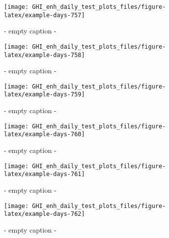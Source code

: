 \documentclass[
  10pt,
  a4paper,oneside]{article}
\begin{document}
\begin{figure}[H]

{\centering \texttt{[image: GHI\_enh\_daily\_test\_plots\_files/figure-latex/example-days-757]} 

}

\caption{ - empty caption - }\label{fig:example-days-757}
\end{figure}

\begin{figure}[H]

{\centering \texttt{[image: GHI\_enh\_daily\_test\_plots\_files/figure-latex/example-days-758]} 

}

\caption{ - empty caption - }\label{fig:example-days-758}
\end{figure}

\begin{figure}[H]

{\centering \texttt{[image: GHI\_enh\_daily\_test\_plots\_files/figure-latex/example-days-759]} 

}

\caption{ - empty caption - }\label{fig:example-days-759}
\end{figure}

\begin{figure}[H]

{\centering \texttt{[image: GHI\_enh\_daily\_test\_plots\_files/figure-latex/example-days-760]} 

}

\caption{ - empty caption - }\label{fig:example-days-760}
\end{figure}

\begin{figure}[H]

{\centering \texttt{[image: GHI\_enh\_daily\_test\_plots\_files/figure-latex/example-days-761]} 

}

\caption{ - empty caption - }\label{fig:example-days-761}
\end{figure}

\begin{figure}[H]

{\centering \texttt{[image: GHI\_enh\_daily\_test\_plots\_files/figure-latex/example-days-762]} 

}

\caption{ - empty caption - }\label{fig:example-days-762}
\end{figure}
\end{document}
